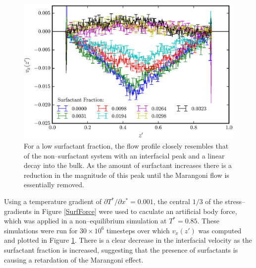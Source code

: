 \begin{figure}[h]
\centering
\includegraphics[scale=0.8]{SurfFlow}
\caption{For a low surfactant fraction, the flow profile closely resembles that of the non--surfactant system with an interfacial peak and a linear decay into the bulk.
As the amount of surfactant increases there is a reduction in the magnitude of this peak until the Marangoni flow is essentially removed.
}
\label{SurfFlow}
\end{figure}
Using a temperature gradient of $\partial T^{*} / \partial x^{*} = 0.001$, the central $1/3$ of the stress--gradients in Figure \ref{SurfForce} were used to caculate an artificial body force, which was applied in a non--equilibrium simulation at $T^{*}=0.85$.
These simulations were run for $30 \times 10^{6}$ timesteps over which $v_{x}(z')$ was computed and plotted in Figure \ref{SurfFlow}.
There is a clear decrease in the interfacial velocity as the surfactant fraction is increased, suggesting that the presence of surfactants is causing a retardation of the Marangoni effect.

